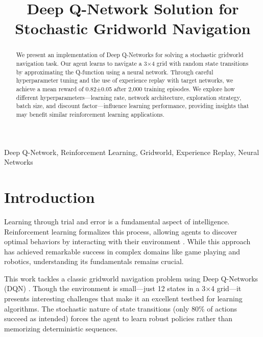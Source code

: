 \documentclass[conference]{IEEEtran}
\begin{document}
\title{Deep Q-Network Solution for Stochastic Gridworld Navigation}

\author{
}

\maketitle

\begin{abstract}
We present an implementation of Deep Q-Networks for solving a stochastic gridworld navigation task. Our agent learns to navigate a 3×4 grid with random state transitions by approximating the Q-function using a neural network. Through careful hyperparameter tuning and the use of experience replay with target networks, we achieve a mean reward of 0.82±0.05 after 2,000 training episodes. We explore how different hyperparameters—learning rate, network architecture, exploration strategy, batch size, and discount factor—influence learning performance, providing insights that may benefit similar reinforcement learning applications.
\end{abstract}

\begin{IEEEkeywords}
Deep Q-Network, Reinforcement Learning, Gridworld, Experience Replay, Neural Networks
\end{IEEEkeywords}

\section{Introduction}

Learning through trial and error is a fundamental aspect of intelligence. Reinforcement learning formalizes this process, allowing agents to discover optimal behaviors by interacting with their environment \cite{sutton2018reinforcement}. While this approach has achieved remarkable success in complex domains like game playing and robotics, understanding its fundamentals remains crucial.

This work tackles a classic gridworld navigation problem using Deep Q-Networks (DQN) \cite{mnih2015human}. Though the environment is small—just 12 states in a 3×4 grid—it presents interesting challenges that make it an excellent testbed for learning algorithms. The stochastic nature of state transitions (only 80\% of actions succeed as intended) forces the agent to learn robust policies rather than memorizing deterministic sequences.
\end{document}

